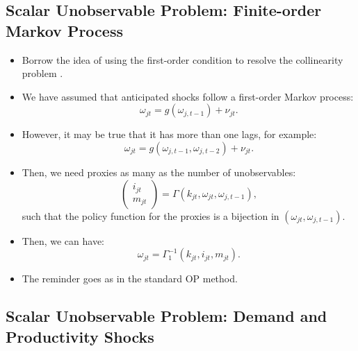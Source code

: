 \documentclass[
]{book}
\begin{document}
\hypertarget{scalar-unobservable-problem-finite-order-markov-process}{%
\subsection{Scalar Unobservable Problem: Finite-order Markov Process}\label{scalar-unobservable-problem-finite-order-markov-process}}

\begin{itemize}
\item
  Borrow the idea of using the first-order condition to resolve the collinearity problem \citep{Gandhi2017a}.
\item
  We have assumed that anticipated shocks follow a first-order Markov process:
  \begin{equation}
  \omega_{jt} = g(\omega_{j, t - 1}) + \nu_{jt}.
  \end{equation}
\item
  However, it may be true that it has more than one lags, for example:
  \begin{equation}
  \omega_{jt} = g(\omega_{j, t - 1}, \omega_{j, t - 2}) + \nu_{jt}.
  \end{equation}
\item
  Then, we need proxies as many as the number of unobservables:
  \begin{equation}
  \begin{pmatrix}
  i_{jt} \\ m_{jt} 
  \end{pmatrix}
  = \Gamma(k_{jt}, \omega_{jt}, \omega_{j, t - 1}),
  \end{equation}
  such that the policy function for the proxies is a bijection in \((\omega_{jt}, \omega_{j, t - 1})\).
\item
  Then, we can have:
  \begin{equation}
  \omega_{jt} = \Gamma_1^{-1}(k_{jt}, i_{jt}, m_{jt}).
  \end{equation}
\item
  The reminder goes as in the standard OP method.
\end{itemize}

\hypertarget{scalar-unobservable-problem-demand-and-productivity-shocks}{%
\subsection{Scalar Unobservable Problem: Demand and Productivity Shocks}\label{scalar-unobservable-problem-demand-and-productivity-shocks}}
\end{document}
